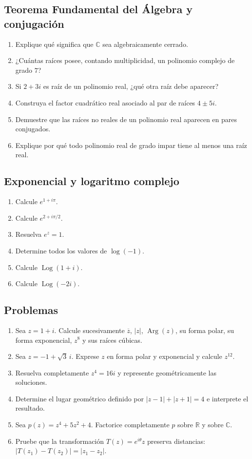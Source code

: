 \documentclass[12pt]{article}
\begin{document}
\subsection*{Teorema Fundamental del Álgebra y conjugación}
\begin{enumerate}
\item Explique qué significa que $\mathbb{C}$ sea algebraicamente cerrado.
\item ¿Cuántas raíces posee, contando multiplicidad, un polinomio complejo de grado $7$?
\item Si $2+3i$ es raíz de un polinomio real, ¿qué otra raíz debe aparecer?
\item Construya el factor cuadrático real asociado al par de raíces $4\pm5i$.
\item Demuestre que las raíces no reales de un polinomio real aparecen en pares conjugados.
\item Explique por qué todo polinomio real de grado impar tiene al menos una raíz real.
\end{enumerate}

\subsection*{Exponencial y logaritmo complejo}
\begin{enumerate}
\item Calcule $e^{1+i\pi}$.
\item Calcule $e^{2+i\pi/2}$.
\item Resuelva $e^z=1$.
\item Determine todos los valores de $\log(-1)$.
\item Calcule $\operatorname{Log}(1+i)$.
\item Calcule $\operatorname{Log}(-2i)$.
\end{enumerate}

\subsection*{Problemas}
\begin{enumerate}
\item Sea $z=1+i$. Calcule sucesivamente $\overline z$, $|z|$, $\operatorname{Arg}(z)$, su forma polar, su forma exponencial, $z^8$ y sus raíces cúbicas.
\item Sea $z=-1+\sqrt3\,i$. Exprese $z$ en forma polar y exponencial y calcule $z^{12}$.
\item Resuelva completamente $z^4=16i$ y represente geométricamente las soluciones.
\item Determine el lugar geométrico definido por $|z-1|+|z+1|=4$ e interprete el resultado.
\item Sea $p(z)=z^4+5z^2+4$. Factorice completamente $p$ sobre $\mathbb{R}$ y sobre $\mathbb{C}$.
\item Pruebe que la transformación $T(z)=e^{i\theta}z$ preserva distancias: $|T(z_1)-T(z_2)|=|z_1-z_2|$.
\end{enumerate}
\end{document}

